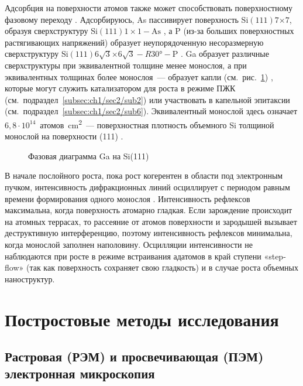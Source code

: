 Адсорбция на поверхности атомов также может способствовать поверхностному
фазовому переходу \cite{Bringans1993, Ji2007}. Адсорбируюсь, As пассивирует
поверхность Si\((111)7\)\(\times\)\(7\), образуя сверхструктуру
Si\((111)1\times1-\text{As}\) \cite{Patel1989, Bringans1992}, а P (из-за
больших поверхностных растягивающих напряжений) образует неупорядоченную
несоразмерную сверхструктуру
Si\((111)6\sqrt{3}\)\(\times\)\(6\sqrt{3}-R30\si{\degree}-\text{P}\)
\cite{Vitali1998, Siriwardena2017}. Ga образует различные сверхструктуры при
эквивалентной толщине менее монослоя, а при эквивалентных толщинах более
монослоя~--- образует капли (см.~рис.~\cref{fig:Image_12}) \cite{Park1988},
которые могут служить катализатором для роста в режиме ПЖК
(см.~подраздел~\cref{subsec:ch1/sec2/sub2}) или участвовать в капельной
эпитаксии (см.~подраздел~\cref{subsec:ch1/sec2/sub6}). Эквивалентный монослой
здесь означает \(6,8 \cdot 10^{14}\)~атомов\si{\per\centi\meter^{2}}~---
поверхностная плотность объемного Si толщиной монослой на поверхности (111)
\cite{Kumar2010}.

\begin{figure}[ht]  \caption{Фазовая диаграмма Ga
на Si(111) \cite{Park1988}}\label{fig:Image_12} \end{figure}

В начале послойного роста, пока рост когерентен в области под электронным
пучком, интенсивность дифракционных линий осциллирует с периодом равным времени
формирования одного монослоя \cite{Harris1981}. Интенсивность рефлексов
максимальна, когда поверхность атомарно гладкая. Если зарождение происходит на
атомных террасах, то рассеяние от атомов поверхности и зародышей вызывает
деструктивную интерференцию, поэтому интенсивность рефлексов минимальна, когда
монослой заполнен наполовину. Осцилляции интенсивности не наблюдаются при росте
в режиме встраивания адатомов в край ступени «step-flow» (так как поверхность
сохраняет свою гладкость) и в случае роста объемных наноструктур.

\section{Постростовые методы исследования}\label{sec:ch2/sec2}

\subsection{Растровая (РЭМ) и просвечивающая (ПЭМ) электронная
микроскопия}\label{subsec:ch2/sec2/sub1}

